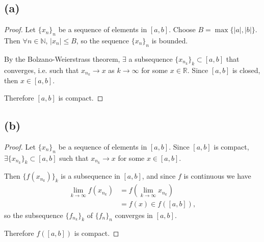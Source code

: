 \documentclass{article}
\newcommand{\R}{\mathbb{R}} %
\newcommand{\N}{\mathbb{N}} %
\begin{document}
\subsection*{(a)}
\begin{proof}
	Let $\{x_n\}_n$ be a sequence of elements in $[a, b]$. Choose $B = \max\{|a|, |b|\}$. Then $\forall n \in \N$, $|x_n| \leq B$, so the sequence $\{x_n\}_n$ is bounded.
	
	By the Bolzano-Weierstrass theorem, $\exists$ a subsequence $\{x_{n_k}\}_k \subset [a, b]$ that converges, i.e. such that $x_{n_k} \to x$ as $k \to \infty$ for some $x \in \R$. Since $[a, b]$ is closed, then $x \in [a, b]$.
	
	Therefore $[a, b]$ is compact.
\end{proof}

\subsection*{(b)}
\begin{proof}
	Let $\{x_n\}_n$ be a sequence of elements in $[a, b]$. Since $[a, b]$ is compact, $\exists \{x_{n_k}\}_k \subset [a, b]$ such that $x_{n_k} \to x$ for some $x \in [a, b]$. 
	
	Then $\{f(x_{n_k})\}_k$ is a subsequence in $[a, b]$, and since $f$ is continuous we have
	\begin{align}
		\lim\limits_{k \to \infty}f\left(x_{n_k}\right) &= f\left(\lim\limits_{k \to \infty} x_{n_k}\right) \\
		&= f(x) \in f \left([a, b]\right),
	\end{align}
	so the subsequence $\{f_{n_k}\}_k$ of $\{f_n\}_n$ converges in $[a, b]$. 
	
	Therefore $f\left([a, b]\right)$ is compact.
\end{proof}
\end{document}
